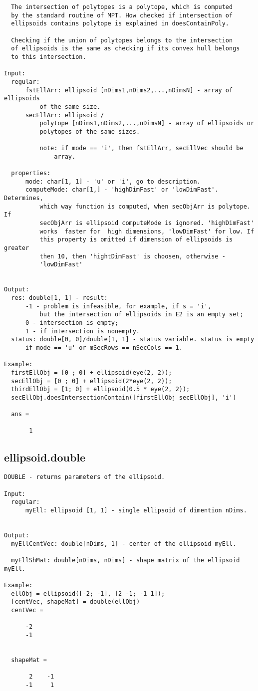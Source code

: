 \begin{verbatim}
  The intersection of polytopes is a polytope, which is computed
  by the standard routine of MPT. How checked if intersection of
  ellipsoids contains polytope is explained in doesContainPoly.

  Checking if the union of polytopes belongs to the intersection
  of ellipsoids is the same as checking if its convex hull belongs
  to this intersection.

Input:
  regular:
      fstEllArr: ellipsoid [nDims1,nDims2,...,nDimsN] - array of ellipsoids
          of the same size.
      secEllArr: ellipsoid /
          polytope [nDims1,nDims2,...,nDimsN] - array of ellipsoids or
          polytopes of the same sizes.

          note: if mode == 'i', then fstEllArr, secEllVec should be
              array.

  properties:
      mode: char[1, 1] - 'u' or 'i', go to description.
      computeMode: char[1,] - 'highDimFast' or 'lowDimFast'. Determines,
          which way function is computed, when secObjArr is polytope. If
          secObjArr is ellipsoid computeMode is ignored. 'highDimFast'
          works  faster for  high dimensions, 'lowDimFast' for low. If
          this property is omitted if dimension of ellipsoids is greater
          then 10, then 'hightDimFast' is choosen, otherwise -
          'lowDimFast'


Output:
  res: double[1, 1] - result:
      -1 - problem is infeasible, for example, if s = 'i',
          but the intersection of ellipsoids in E2 is an empty set;
      0 - intersection is empty;
      1 - if intersection is nonempty.
  status: double[0, 0]/double[1, 1] - status variable. status is empty
      if mode == 'u' or mSecRows == nSecCols == 1.

Example:
  firstEllObj = [0 ; 0] + ellipsoid(eye(2, 2));
  secEllObj = [0 ; 0] + ellipsoid(2*eye(2, 2));
  thirdEllObj = [1; 0] + ellipsoid(0.5 * eye(2, 2));
  secEllObj.doesIntersectionContain([firstEllObj secEllObj], 'i')

  ans =

       1
\end{verbatim}
\subsection{\texorpdfstring{ellipsoid.double}{double}}\label{method:ellipsoid.double}
\begin{verbatim}
DOUBLE - returns parameters of the ellipsoid.

Input:
  regular:
      myEll: ellipsoid [1, 1] - single ellipsoid of dimention nDims.


Output:
  myEllCentVec: double[nDims, 1] - center of the ellipsoid myEll.

  myEllShMat: double[nDims, nDims] - shape matrix of the ellipsoid myEll.

Example:
  ellObj = ellipsoid([-2; -1], [2 -1; -1 1]);
  [centVec, shapeMat] = double(ellObj)
  centVec =

      -2
      -1


  shapeMat =

       2    -1
      -1     1
\end{verbatim}
